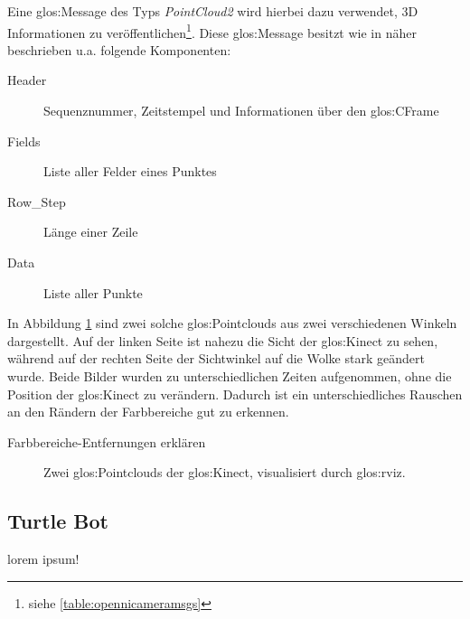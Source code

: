 Eine \gls{glos:Message} des Typs \emph{PointCloud2} wird hierbei dazu verwendet, 3D Informationen zu veröffentlichen\footnote{siehe \ref{table:opennicameramsgs}}. Diese \gls{glos:Message} besitzt wie in \cite{online:pointcloud2} näher beschrieben u.a. folgende Komponenten:

\begin{description}
	\item[Header]		Sequenznummer, Zeitstempel und Informationen über den \gls{glos:CFrame}
	\item[Fields]		Liste aller Felder eines Punktes
	\item[Row\_Step]	Länge einer Zeile
	\item[Data]		Liste aller Punkte
\end{description}

In Abbildung \ref{fig:kinectViews} sind zwei solche \glspl{glos:Pointcloud} aus zwei verschiedenen Winkeln dargestellt. Auf der linken Seite ist nahezu die Sicht der \gls{glos:Kinect} zu sehen, während auf der rechten Seite der Sichtwinkel auf die Wolke stark geändert wurde. Beide Bilder wurden zu unterschiedlichen Zeiten aufgenommen, ohne die Position der \gls{glos:Kinect} zu verändern. Dadurch ist ein unterschiedliches Rauschen an den Rändern der Farbbereiche gut zu erkennen.

{\color{red}Farbbereiche-Entfernungen erklären}

\begin{figure}[t]
	\centering
	\caption[Kinect Pointcloud]{Zwei \glspl{glos:Pointcloud} der \gls{glos:Kinect}, visualisiert durch \gls{glos:rviz}.}
	\label{fig:kinectViews}
\end{figure}

\subsection{Turtle Bot}
{\color{red}lorem ipsum!}